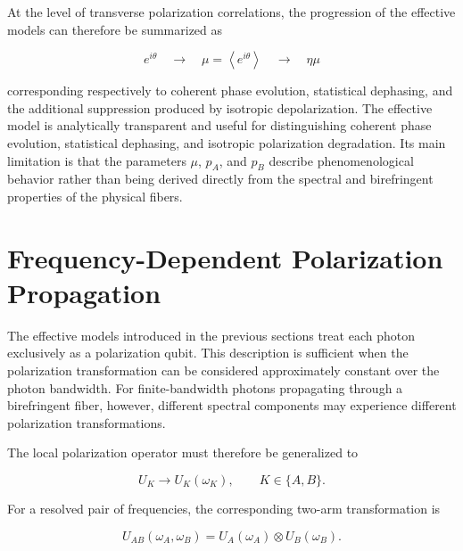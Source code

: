 At the level of transverse polarization correlations, the progression of the
effective models can therefore be summarized as

\begin{equation}
\boxed{
e^{i\theta}
\quad\longrightarrow\quad
\mu=\left\langle e^{i\theta}\right\rangle
\quad\longrightarrow\quad
\eta\mu
}
\label{eq:effective_model_progression}
\end{equation}

corresponding respectively to coherent phase evolution, statistical dephasing,
and the additional suppression produced by isotropic depolarization.
The effective model is analytically transparent and useful for distinguishing
coherent phase evolution, statistical dephasing, and isotropic polarization
degradation. Its main limitation is that the parameters
\(\mu\), \(p_A\), and \(p_B\) describe phenomenological behavior rather than being derived
directly from the spectral and birefringent properties of the physical fibers.


\section{Frequency-Dependent Polarization Propagation}
\label{sec:frequency_dependent_propagation}

The effective models introduced in the previous sections treat each photon
exclusively as a polarization qubit. This description is sufficient when the
polarization transformation can be considered approximately constant over the
photon bandwidth. For finite-bandwidth photons propagating through a birefringent
fiber, however, different spectral components may experience different
polarization transformations.

The local polarization operator must therefore be generalized to

\begin{equation}
U_K
\longrightarrow
U_K(\omega_K),
\qquad
K\in\{A,B\}.
\label{eq:frequency_dependent_local_unitary}
\end{equation}

For a resolved pair of frequencies, the corresponding two-arm transformation is

\begin{equation}
U_{AB}(\omega_A,\omega_B)
=
U_A(\omega_A)
\otimes
U_B(\omega_B).
\label{eq:frequency_dependent_two_arm_unitary}
\end{equation}

